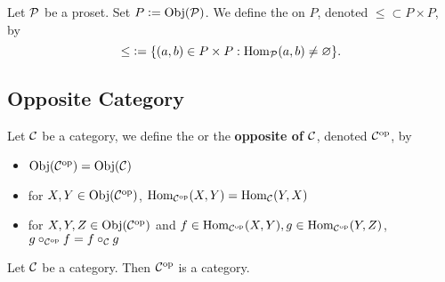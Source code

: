 \documentclass{book}
\begin{document}
	\begin{defn}
		Let $\mathcal{P}$ be a proset. Set $P \vcentcolon= \operatorname{Obj}(\mathcal{P})$. We define the  on $P$, denoted ${\leq} \subset P \times P$, by 
		$${\leq} \vcentcolon= \{(a,b) \in P \times P: \operatorname{Hom}_{\mathcal{P}}(a,b) \neq \varnothing\}.$$
	\end{defn}


















	
	
	\subsection{Opposite Category}

	\begin{defn}  \ld{12004}
		Let $\mathcal{C}$ be a category, we define the  or the \textbf{opposite of $\mathcal{C}$}, denoted $\mathcal{C}^{\text{op}}$, by 
		\begin{itemize}
			\item $\operatorname{Obj}(\mathcal{C}^{\text{op}}) = \operatorname{Obj}(\mathcal{C})$
			\item for $X,Y \in \operatorname{Obj}(\mathcal{C}^{\text{op}})$, $\operatorname{Hom}_{\mathcal{C}^{\text{op}}}(X,Y) = \operatorname{Hom}_{\mathcal{C}}(Y,X)$
			\item for $X, Y, Z \in \operatorname{Obj}(\mathcal{C}^{\text{op}})$ and $f \in \operatorname{Hom}_{\mathcal{C}^{\text{op}}}(X, Y), g \in \operatorname{Hom}_{\mathcal{C}^{\text{op}}}(Y,Z)$, $g \circ_{\mathcal{C}^{\text{op}}} f = f \circ_{\mathcal{C}} g$
		\end{itemize}
	\end{defn}

	\begin{ex}  
		Let $\mathcal{C}$ be a category. Then $\mathcal{C}^{\text{op}}$ is a category.
	\end{ex}
	
\end{document}
